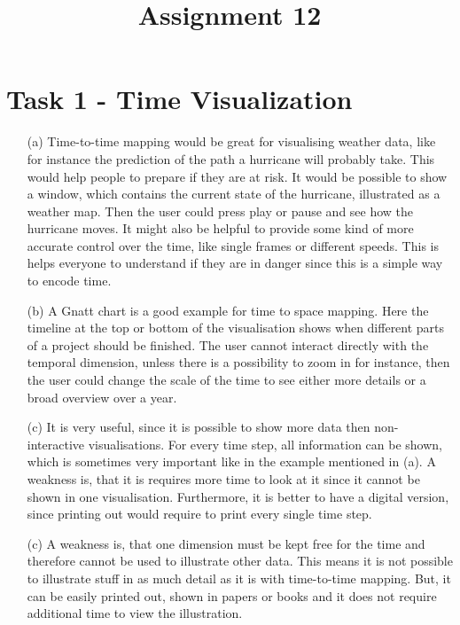 \documentclass[a4paper]{article}
\date{}
\author{}
\title{\textbf{Assignment 12}}
\begin{document}
\maketitle 
\thispagestyle{fancy}

\section*{Task 1 - Time Visualization}
\begin{enumerate}
	\item[(a)] Time-to-time mapping would be great for visualising weather data, like for instance the prediction of the path a hurricane will probably take. 
	This would help people to prepare if they are at risk. 
	It would be possible to show a window, which contains the current state of the hurricane, illustrated as a weather map. 
	Then the user could press play or pause and see how the hurricane moves. 
	It might also be helpful to provide some kind of more accurate control over the time, like single frames or different speeds. 
	This is helps everyone to understand if they are in danger since this is a simple way to encode time. 
	\item[(b)] A Gnatt chart is a good example for time to space mapping. 
	Here the timeline at the top or bottom of the visualisation shows when different parts of a project should be finished. 
	The user cannot interact directly with the temporal dimension, unless there is a possibility to zoom in for instance, then the user could change the scale of the time to see either more details or a broad overview over a year. 
	\item[(c)] It is very useful, since it is possible to show more data then non-interactive visualisations. 
	For every time step, all information can be shown, which is sometimes very important like in the example mentioned in (a). 
	A weakness is, that it is requires more time to look at it since it cannot be shown in one visualisation. 
	Furthermore, it is better to have a digital version, since printing out would require to print every single time step. 
	\item[(c)] A weakness is, that one dimension must be kept free for the time and therefore cannot be used to illustrate other data. 
	This means it is not possible to illustrate stuff in as much detail as it is with time-to-time mapping. 
	But, it can be easily printed out, shown in papers or books and it does not require additional time to view the illustration. 
\end{enumerate}
\end{document}
